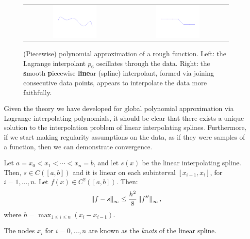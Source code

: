 \begin{figure}[htbp]
\begin{center}
\begin{tabular}{cc}
\hspace*{-0.5cm}\includegraphics[width=0.45\textwidth]{spline1a}&
\hspace*{-0.5cm}\includegraphics[width=0.45\textwidth]{spline1b}\\
\end{tabular}
\vspace*{-1cm}
\caption{(Piecewise) polynomial approximation of a rough function. Left: the Lagrange interpolant $p_6$ oscillates through the data. Right: the {\bf s}mooth {\bf p}iecewise {\bf line}ar (spline) interpolant, formed via joining consecutive data points, appears to interpolate the data more faithfully.}
\label{figure:SplineIntro}
\end{center}
\end{figure}

Given the theory we have developed for global polynomial approximation via Lagrange interpolating polynomials, it should be clear that there exists a unique solution to the interpolation problem of linear interpolating splines. Furthermore, if we start making regularity assumptions on the data, as if they were samples of a function, then we can demonstrate convergence.

\begin{theorem}\label{theorem:LinearSplineConvergence}
Let $a=x_0<x_1<\cdots<x_n=b$, and let $s(x)$ be the linear interpolating spline. Then, $s\in C([a,b])$ and it is linear on each subinterval $[x_{i-1},x_i]$, for $i=1,\ldots,n$. Let $f(x)\in C^2([a,b])$. Then:
\[
\left\|{f-s}\right\|_\infty \le \dfrac{h^2}{8}\left\|{f''}\right\|_\infty,
\]
where $h=\max_{1\le i\le n}(x_i-x_{i-1})$.
\end{theorem}
The nodes $x_i$ for $i=0,\ldots,n$ are known as the {\em knots} of the linear spline.

